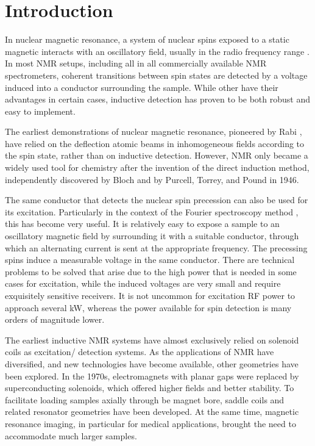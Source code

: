 

\section{Introduction}

In nuclear magnetic resonance, a system of nuclear spins exposed to a static 
magnetic interacts with an oscillatory field, usually in the radio frequency range 
\cite{Abragam:1961vg}. 
In most NMR setups, including all in all commercially available NMR
spectrometers, coherent transitions between spin
states are detected by a voltage induced into a 
conductor surrounding the sample. 
While other have 
their advantages in certain cases, inductive detection has proven to be both robust and 
easy to implement. 

The earliest demonstrations of nuclear magnetic resonance, pioneered 
by Rabi \cite{Rabi:1938tq}, have relied on the deflection atomic beams in inhomogeneous fields according to the spin state, rather than on inductive detection.
However, NMR only became a widely used tool for chemistry after the invention of the direct induction 
method, independently discovered by Bloch \cite{Bloch:1946hk} 
and by Purcell, Torrey, and Pound \cite{Purcell:1946ft} in 1946. 

The same conductor that detects the nuclear spin precession can also be used for its excitation. 
Particularly in the context of the Fourier spectroscopy method \cite{Ernst:1966cr}, this has 
become very useful. It is relatively easy to expose a sample to an oscillatory magnetic field by 
surrounding it with a suitable conductor, through which an alternating current is sent at the appropriate 
frequency. The precessing spins induce a measurable voltage in the same conductor. There are 
technical problems to be solved that arise due to the high power that is needed in some cases for 
excitation, while the induced voltages are very small and require exquisitely sensitive receivers. It 
is not uncommon for excitation RF power to approach several kW, whereas the power available for spin 
detection is many orders of magnitude lower.

The earliest inductive NMR systems have almost exclusively relied on solenoid coils as excitation/
detection systems. As the applications of NMR have diversified, and new technologies have become 
available, other geometries have been explored. In the 1970s, electromagnets
with planar gaps were replaced by superconducting solenoids, which offered
higher fields and better stability. To facilitate loading samples 
axially through be magnet bore, saddle coils and related resonator geometries have been developed.  At the same time, magnetic resonance imaging, in particular for medical applications, brought the need to accommodate  much larger samples. 

